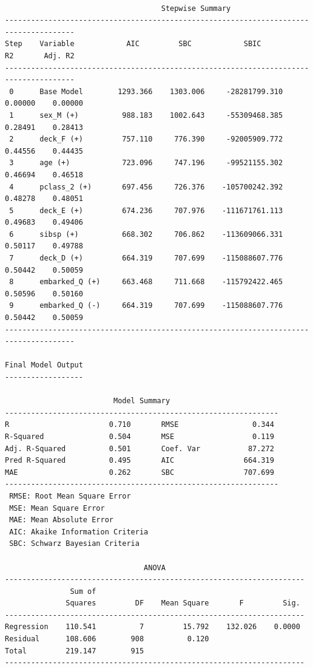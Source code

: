 \documentclass[
  letterpaper,
  DIV=11,
  numbers=noendperiod]{scrartcl}
\begin{document}
\begin{verbatim}

                                    Stepwise Summary                                    
--------------------------------------------------------------------------------------
Step    Variable            AIC         SBC            SBIC           R2       Adj. R2 
--------------------------------------------------------------------------------------
 0      Base Model        1293.366    1303.006     -28281799.310    0.00000    0.00000 
 1      sex_M (+)          988.183    1002.643     -55309468.385    0.28491    0.28413 
 2      deck_F (+)         757.110     776.390     -92005909.772    0.44556    0.44435 
 3      age (+)            723.096     747.196     -99521155.302    0.46694    0.46518 
 4      pclass_2 (+)       697.456     726.376    -105700242.392    0.48278    0.48051 
 5      deck_E (+)         674.236     707.976    -111671761.113    0.49683    0.49406 
 6      sibsp (+)          668.302     706.862    -113609066.331    0.50117    0.49788 
 7      deck_D (+)         664.319     707.699    -115088607.776    0.50442    0.50059 
 8      embarked_Q (+)     663.468     711.668    -115792422.465    0.50596    0.50160 
 9      embarked_Q (-)     664.319     707.699    -115088607.776    0.50442    0.50059 
--------------------------------------------------------------------------------------

Final Model Output 
------------------

                         Model Summary                          
---------------------------------------------------------------
R                       0.710       RMSE                 0.344 
R-Squared               0.504       MSE                  0.119 
Adj. R-Squared          0.501       Coef. Var           87.272 
Pred R-Squared          0.495       AIC                664.319 
MAE                     0.262       SBC                707.699 
---------------------------------------------------------------
 RMSE: Root Mean Square Error 
 MSE: Mean Square Error 
 MAE: Mean Absolute Error 
 AIC: Akaike Information Criteria 
 SBC: Schwarz Bayesian Criteria 

                                ANOVA                                 
---------------------------------------------------------------------
               Sum of                                                
              Squares         DF    Mean Square       F         Sig. 
---------------------------------------------------------------------
Regression    110.541          7         15.792    132.026    0.0000 
Residual      108.606        908          0.120                      
Total         219.147        915                                     
---------------------------------------------------------------------


\end{verbatim}
\end{document}
